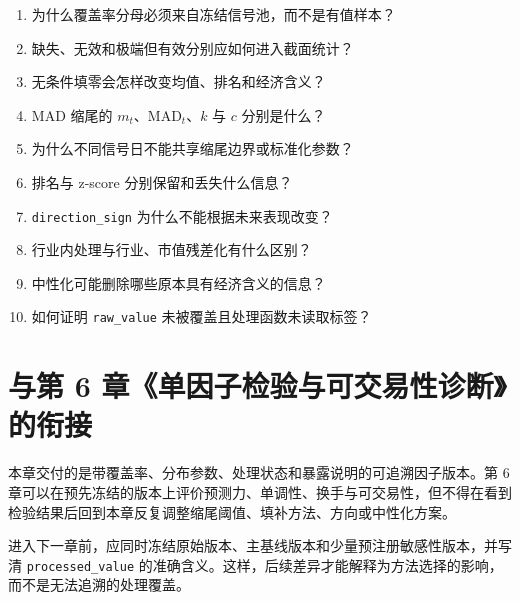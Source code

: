 \begin{quizbox}
\begin{enumerate}
  \item 为什么覆盖率分母必须来自冻结信号池，而不是有值样本？
  \item 缺失、无效和极端但有效分别应如何进入截面统计？
  \item 无条件填零会怎样改变均值、排名和经济含义？
  \item MAD 缩尾的 \(m_t\)、\(\mathrm{MAD}_t\)、\(k\) 与 \(c\) 分别是什么？
  \item 为什么不同信号日不能共享缩尾边界或标准化参数？
  \item 排名与 z-score 分别保留和丢失什么信息？
  \item \texttt{direction\_sign} 为什么不能根据未来表现改变？
  \item 行业内处理与行业、市值残差化有什么区别？
  \item 中性化可能删除哪些原本具有经济含义的信息？
  \item 如何证明 \texttt{raw\_value} 未被覆盖且处理函数未读取标签？
\end{enumerate}
\end{quizbox}

\section{与第 6 章《单因子检验与可交易性诊断》的衔接}

本章交付的是带覆盖率、分布参数、处理状态和暴露说明的可追溯因子版本。第 6 章可以在预先冻结的版本上评价预测力、单调性、换手与可交易性，但不得在看到检验结果后回到本章反复调整缩尾阈值、填补方法、方向或中性化方案。

进入下一章前，应同时冻结原始版本、主基线版本和少量预注册敏感性版本，并写清
\texttt{processed\_value} 的准确含义。这样，后续差异才能解释为方法选择的影响，而不是无法追溯的处理覆盖。

